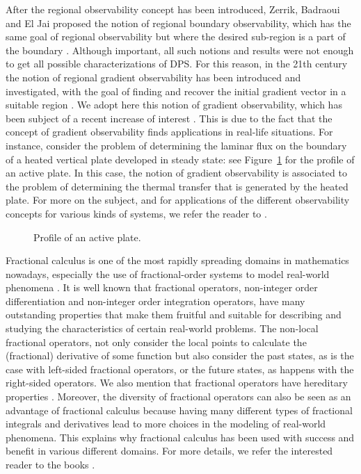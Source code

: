 \documentclass{article}
\begin{document}
After the regional observability concept has been introduced,
Zerrik, Badraoui and El Jai proposed the notion of 
regional boundary observability, which has the same goal 
of regional observability but where the desired sub-region 
is a part of the boundary \cite{zerrik.bnd.200,zerrik.bnd.1999}. 
Although important, all such notions and results were not enough 
to get all possible characterizations of DPS. 
For this reason, in the 21th century the notion of 
regional gradient observability has been introduced
and investigated, with the goal of finding and recover 
the initial gradient vector in a suitable region
\cite{zerrik.grd.2003,zerrik.grd.2000}.
We adopt here this notion of gradient observability, 
which has been subject of a recent increase of interest 
\cite{grad.frac,MR3802082,MR3757160}. This is due to the fact 
that the concept of gradient observability finds applications 
in real-life situations. For instance, consider the problem 
of determining the laminar flux on the boundary of a heated vertical 
plate developed in steady state: see Figure~\ref{plate} 
for the profile of an active plate. In this case, the notion 
of gradient observability is associated to the problem 
of determining the thermal transfer that is generated by the heated plate.
For more on the subject, and for applications of the different observability 
concepts for various kinds of systems, we refer the reader to 
\cite{boutoulout.2010,boutoulout.2013,boutoulout.2015,boutoulout.2014}.
\begin{figure}
\caption{\label{plate} Profile of an active plate.}
\end{figure} 

Fractional calculus is one of the most rapidly spreading 
domains in mathematics nowadays, especially the use of fractional-order systems 
to model real-world phenomena \cite{hand.bal.A,hand.bal.B,hand.petras,torres_roda.2021,torres_rosa.2022}.
It is well known that fractional operators, non-integer order differentiation and 
non-integer order integration operators, have many outstanding properties 
that make them fruitful and suitable for describing and studying 
the characteristics of certain real-world problems. The non-local fractional 
operators, not only consider the local points to calculate the (fractional) derivative 
of some function but also consider the past states, as is the case with left-sided fractional 
operators, or the future states, as happens with the right-sided operators. We also mention that
fractional operators have hereditary properties \cite{hand.taras.A,hand.taras.B}. Moreover, 
the diversity of fractional operators can also be seen as an advantage of fractional calculus 
because having many different types of fractional integrals and derivatives lead to more choices 
in the modeling of real-world phenomena. This explains why fractional calculus has been used
with success and benefit in various different domains. For more details, we refer 
the interested reader to the books \cite{torres_nda.2021,podlubny}.
\end{document}
